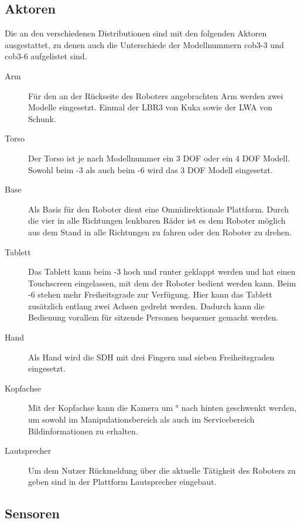 \subsection{Aktoren}

Die an den verschiedenen \cob Distributionen sind mit den folgenden Aktoren
ausgestattet, zu denen auch die Unterschiede der Modellnummern cob3-3 und
cob3-6 aufgelistet sind.

\begin{description}
  \item[Arm] Für den an der Rückseite des Roboters
    angebrachten Arm werden zwei Modelle eingesetzt. Einmal der \ac{LBR3} von
    Kuka sowie der \ac{LWA} von Schunk. 
  \item[Torso] Der Torso ist je nach
    Modellnummer ein 3 \ac{DOF} oder ein 4 \ac{DOF} Modell. Sowohl beim -3 als auch beim -6 wird das 3 \ac{DOF} Modell eingesetzt.
  \item[Base] Als Basis für den Roboter dient eine Omnidirektionale Plattform.
    Durch die vier in alle Richtungen lenkbaren Räder ist es dem Roboter möglich
    aus dem Stand in alle Richtungen zu fahren oder den Roboter zu drehen.
  \item[Tablett] Das Tablett kann beim -3 hoch und runter geklappt werden
    und hat einen Touchscreen eingelassen, mit dem der Roboter bedient werden
    kann. Beim -6 stehen mehr Freiheitsgrade zur Verfügung. Hier kann das
    Tablett zusätzlich entlang zwei Achsen gedreht werden. Dadurch kann die
    Bedienung vorallem für sitzende Personen bequemer gemacht werden. 
  \item[Hand]
    Als Hand wird die \ac{SDH} mit drei Fingern und sieben Freiheitsgraden
    eingesetzt. 
  \item[Kopfachse] Mit der Kopfachse kann die Kamera um \unit[180]{°} nach
    hinten geschwenkt werden, um sowohl im Manipulationsbereich als auch im
     Servicebereich Bildinformationen zu erhalten. 
  \item[Lautsprecher] Um dem
    Nutzer Rückmeldung über die aktuelle Tätigkeit des Roboters zu geben sind in
    der Plattform Lautsprecher eingebaut.

\end{description}

\subsection{Sensoren}

